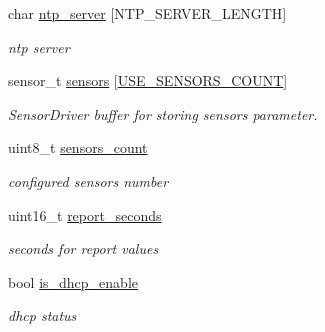 \begin{DoxyCompactItemize}
char \hyperlink{structconfiguration__t_a8de58dc10dfc6b369f34bae82426be5d}{ntp\+\_\+server} \mbox{[}N\+T\+P\+\_\+\+S\+E\+R\+V\+E\+R\+\_\+\+L\+E\+N\+G\+TH\mbox{]}
\begin{DoxyCompactList}\small\item\em ntp server \end{DoxyCompactList}\item 
\mbox{\label{structconfiguration__t_adede74f3da6d26f5bc4b5e64e4776f7f}} 
sensor\+\_\+t \hyperlink{structconfiguration__t_adede74f3da6d26f5bc4b5e64e4776f7f}{sensors} \mbox{[}\hyperlink{rmap-config_8h_af18dc3de744722cb308451b7a705611b}{U\+S\+E\+\_\+\+S\+E\+N\+S\+O\+R\+S\+\_\+\+C\+O\+U\+NT}\mbox{]}
\begin{DoxyCompactList}\small\item\em Sensor\+Driver buffer for storing sensors parameter. \end{DoxyCompactList}\item 
\mbox{\label{structconfiguration__t_a9a1e7c702c2dd7270f31aca29264db86}} 
uint8\+\_\+t \hyperlink{structconfiguration__t_a9a1e7c702c2dd7270f31aca29264db86}{sensors\+\_\+count}
\begin{DoxyCompactList}\small\item\em configured sensors number \end{DoxyCompactList}\item 
\mbox{\label{structconfiguration__t_a0c0dc512cf86464d2e8dad486e042c5c}} 
uint16\+\_\+t \hyperlink{structconfiguration__t_a0c0dc512cf86464d2e8dad486e042c5c}{report\+\_\+seconds}
\begin{DoxyCompactList}\small\item\em seconds for report values \end{DoxyCompactList}\item 
\mbox{\label{structconfiguration__t_a04554256dd43582433092cd70dd8b87d}} 
bool \hyperlink{structconfiguration__t_a04554256dd43582433092cd70dd8b87d}{is\+\_\+dhcp\+\_\+enable}
\begin{DoxyCompactList}\small\item\em dhcp status \end{DoxyCompactList}\item 
\mbox{\label{structconfiguration__t_a6ade77826c87e62532cae8ca0f045dac}} 

\end{DoxyCompactItemize}
